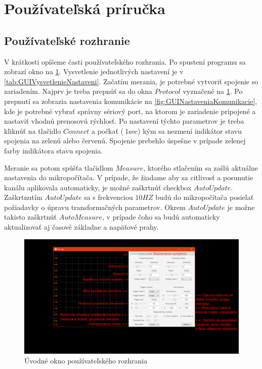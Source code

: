 \documentclass[main.tex]{subfiles}
\begin{document}
	\newpage
	\pagebreak
	\section{Používateľská príručka}
		\begin{multicols}{2}
			\subsection{Používateľské rozhranie}
			V krátkosti opíšeme časti používateľského rozhrania. Po spustení programu sa zobrazí okno na \cref{fig:GUIPrveOkno}. Vysvetlenie jednotlivých nastavení je v \cref{tab:GUIVysvetlenieNastaveni}. Začatím merania, je potrebné vytvoriť spojenie so zariadením. Najprv je treba prepnúť sa do okna $Protocol$ vyznačené na \cref{fig:GUIPrveOkno}. Po prepnutí sa zobrazia nastavenia komunikácie na \cref{fig:GUINastaveniaKomunikacie}, kde je potrebné vybrať správny sériový port, na ktorom je zariadenie pripojené a nastaviť vhodnú prenosovú rýchlosť. Po nastavení týchto parametrov je treba kliknúť na tlačidlo $Connect$ a počkať ($~1$sec) kým sa nezmení indikátor stavu spojenia na zelenú alebo červenú. Spojenie prebehlo úspešne v prípade zelenej farby indikátora stavu spojenia.
			
			Meranie sa potom spúšťa tlačidlom $Measure$, ktorého stlačením sa zašlú aktuálne nastavenia do mikropočítača. V prípade, že žiadame aby sa citlivosť a posunutie kanálu aplikovala automaticky, je možné zaškrtnúť checkbox $Auto Update$. Zaškrtnutím $Auto Update$ sa s frekvenciou $10HZ$ budú do mikropočítača posielať požiadavky o úpravu transformačných parametrov. Okrem $Auto Update$ je možne takisto zaškrtnúť $Auto Measure$, v prípade čoho sa budú automaticky aktualizovať aj časové základne a napäťové prahy.
			
			
		\end{multicols}
	
		\begin{figure}[h!]
			\centering
			\includegraphics[width=\linewidth]{../Obrazky/GUIPrveOkno}
			\caption{Úvodné okno používateľského rozhrania}
			\label{fig:GUIPrveOkno}
		\end{figure}
	
\end{document}
